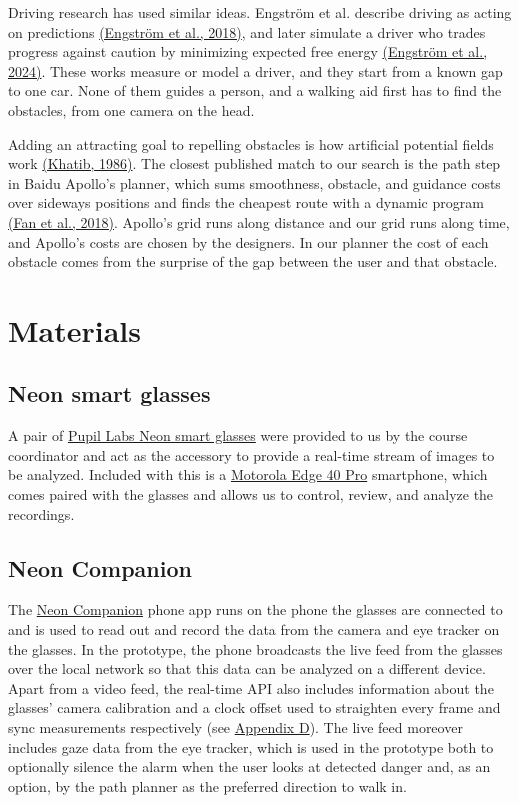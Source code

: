 \documentclass[a4paper]{article}
\begin{document}
Driving research has used similar ideas. Engström et al. describe driving as acting on predictions \hyperref[references]{(Engström et al., 2018)}, and later simulate a driver who trades progress against caution by minimizing expected free energy \hyperref[references]{(Engström et al., 2024)}. These works measure or model a driver, and they start from a known gap to one car. None of them guides a person, and a walking aid first has to find the obstacles, from one camera on the head.

Adding an attracting goal to repelling obstacles is how artificial potential fields work \hyperref[references]{(Khatib, 1986)}. The closest published match to our search is the path step in Baidu Apollo's planner, which sums smoothness, obstacle, and guidance costs over sideways positions and finds the cheapest route with a dynamic program \hyperref[references]{(Fan et al., 2018)}. Apollo's grid runs along distance and our grid runs along time, and Apollo's costs are chosen by the designers. In our planner the cost of each obstacle comes from the surprise of the gap between the user and that obstacle.

\section{Materials} \label{materials}
\subsection{Neon smart glasses} \label{neon-smart-glasses}
A pair of \href{https://pupil-labs.com/products/neon}{Pupil Labs Neon smart glasses} were provided to us by the course coordinator and act as the accessory to provide a real-time stream of images to be analyzed. Included with this is a \href{https://mijnmoto.nl/product/motorola-edge-40-pro/}{Motorola Edge 40 Pro} smartphone, which comes paired with the glasses and allows us to control, review, and analyze the recordings. 
\subsection{Neon Companion} \label{neon-companion}
The \href{https://pupil-labs.com/products/neon/software}{Neon Companion} phone app runs on the phone the glasses are connected to and is used to read out and record the data from the camera and eye tracker on the glasses. In the prototype, the phone broadcasts the live feed from the glasses over the local network so that this data can be analyzed on a different device. Apart from a video feed, the real-time API also includes information about the glasses' camera calibration and a clock offset used to straighten every frame and sync measurements respectively (see \hyperref[d-neon-companion-api]{Appendix D}). The live feed moreover includes gaze data from the eye tracker, which is used in the prototype both to optionally silence the alarm when the user looks at detected danger and, as an option, by the path planner as the preferred direction to walk in.
\end{document}
